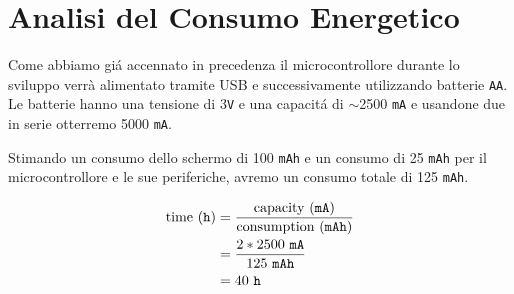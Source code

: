 \documentclass[a4paper]{article}
\begin{document}


\section{Analisi del Consumo Energetico}

Come abbiamo gi\'a accennato in precedenza il microcontrollore durante lo sviluppo verrà alimentato tramite USB e successivamente utilizzando batterie \texttt{AA}. Le batterie hanno una tensione di 3\texttt{V} e una capacit\'a di $\sim$2500 \texttt{mA} e usandone due in serie otterremo 5000 \texttt{mA}.

Stimando un consumo dello schermo di 100 \texttt{mAh} e un consumo di 25 \texttt{mAh} per il microcontrollore e le sue periferiche, avremo un consumo totale di 125 \texttt{mAh}.

\begin{equation*}
    \begin{aligned}
        \textmd{time} \ (\texttt{h}) & = \frac{\textmd{capacity} \ (\texttt{mA})}{\textmd{consumption} \ (\texttt{mAh})}\\
                                     & = \frac{2 * 2500 \ \texttt{mA}}{125 \ \texttt{mAh}}\\
                                     & = 40 \ \texttt{h}
    \end{aligned}
\end{equation*}
\end{document}
